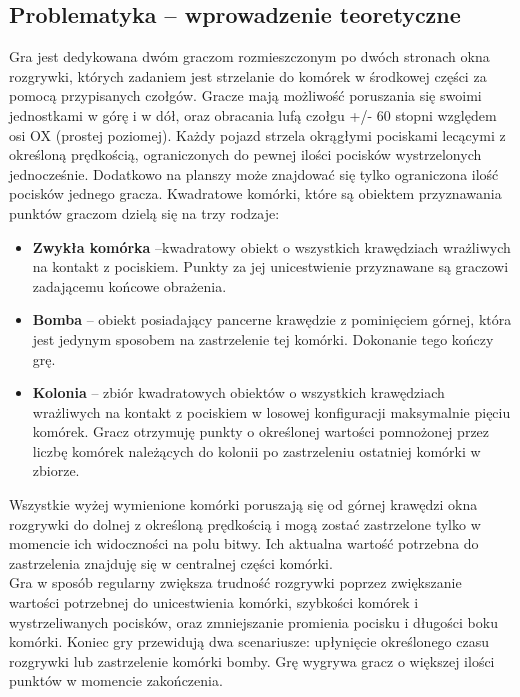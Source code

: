 \documentclass[11pt,a4paper]{report}
\begin{document}
\subsection {Problematyka -- wprowadzenie teoretyczne}
Gra jest dedykowana dwóm graczom rozmieszczonym po dwóch stronach okna rozgrywki, których zadaniem jest strzelanie do komórek w środkowej części za pomocą przypisanych czołgów. Gracze mają możliwość poruszania się swoimi jednostkami w górę i w dół, oraz obracania lufą czołgu +/- 60 stopni względem osi OX (prostej poziomej). Każdy pojazd strzela okrągłymi pociskami lecącymi z określoną prędkością, ograniczonych do pewnej ilości pocisków wystrzelonych jednocześnie. Dodatkowo na planszy może znajdować się tylko ograniczona ilość pocisków jednego gracza. Kwadratowe komórki, które są obiektem przyznawania punktów graczom dzielą się na trzy rodzaje: 
\begin {itemize}
\item\textbf {Zwykła komórka} --kwadratowy obiekt o wszystkich krawędziach wrażliwych na kontakt z pociskiem. Punkty za jej unicestwienie przyznawane są graczowi zadającemu końcowe obrażenia.
\item\textbf {Bomba} -- obiekt posiadający pancerne krawędzie z pominięciem górnej, która jest jedynym sposobem na zastrzelenie tej komórki. Dokonanie tego kończy grę.
\item\textbf {Kolonia} -- zbiór kwadratowych obiektów o wszystkich krawędziach wrażliwych na kontakt z pociskiem w losowej konfiguracji maksymalnie pięciu komórek. Gracz otrzymuję punkty o określonej wartości pomnożonej przez liczbę komórek należących do kolonii po zastrzeleniu ostatniej komórki w zbiorze. 
\end {itemize}
Wszystkie wyżej wymienione komórki poruszają się od górnej krawędzi okna rozgrywki do dolnej z określoną prędkością i mogą zostać zastrzelone tylko w momencie ich widoczności na polu bitwy. Ich aktualna wartość potrzebna do zastrzelenia znajduję się w centralnej części komórki.\\
Gra w sposób regularny zwiększa trudność rozgrywki poprzez zwiększanie wartości potrzebnej do unicestwienia komórki, szybkości komórek i wystrzeliwanych pocisków, oraz zmniejszanie promienia pocisku i długości boku komórki.
Koniec gry przewidują dwa scenariusze: upłynięcie określonego czasu rozgrywki lub zastrzelenie komórki bomby. Grę wygrywa gracz o większej ilości punktów w momencie zakończenia. 
\end{document}
